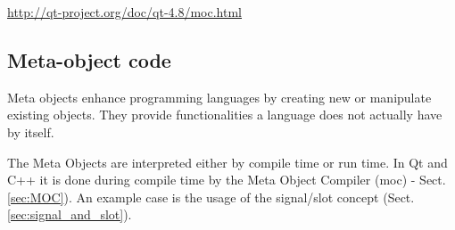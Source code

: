 \url{http://qt-project.org/doc/qt-4.8/moc.html}

\subsection{Meta-object code}

Meta objects enhance programming languages by creating new or manipulate
existing objects. They provide functionalities a language does not actually have
by itself.

The Meta Objects are interpreted either by compile time or run time. In Qt and
C++ it is done during compile time by the Meta Object Compiler (moc) -
Sect.\ref{sec:MOC}). An example case is the usage of the signal/slot concept
(Sect.\ref{sec:signal_and_slot}).

